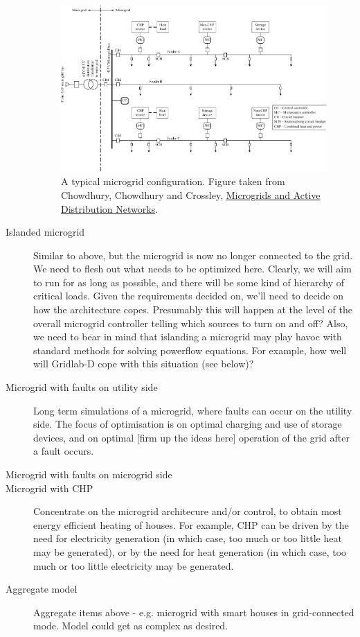 \documentclass[12pt]{article}
\begin{document}
\begin{description}
\begin{figure}
\begin{center}
\includegraphics[width=11cm]{MGSchematic.pdf}
\caption{A typical microgrid configuration. Figure taken from Chowdhury, Chowdhury and Crossley, \ul{Microgrids and Active Distribution Networks}.}
\end{center}
\end{figure}

\item[Islanded microgrid] Similar to above, but the microgrid is now no longer connected to the grid. We need to flesh out what needs to be optimized here. Clearly, we will aim to run for as long as possible, and there will be some kind of hierarchy of critical loads. Given the requirements decided on, we'll need to decide on how the architecture copes. Presumably this will happen at the level of the overall microgrid controller telling which sources to turn on and off? Also, we need to bear in mind that islanding a microgrid may play havoc with standard methods for solving powerflow equations. For example, how well will Gridlab-D cope with this situation (see below)?

\item[Microgrid with faults on utility side] Long term simulations of a microgrid, where faults can occur on the utility side. The focus of optimisation is on optimal charging and use of storage devices, and on optimal [firm up the ideas here] operation of the grid after a fault occurs. 

\item[Microgrid with faults on microgrid side]

\item[Microgrid with CHP] Concentrate on the microgrid architecure and/or control, to obtain most energy efficient heating of houses. For example, CHP can be driven by the need for electricity generation (in which case, too much or too little heat may be generated), or by the need for heat generation (in which case, too much or too little electricity may be generated.

\item[Aggregate model] Aggregate items above - e.g. microgrid with smart houses in grid-connected mode. Model could get as complex as desired.

\end{description}
\end{document}

